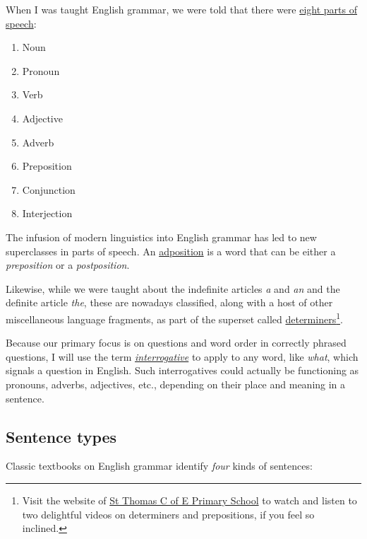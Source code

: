 \documentclass[
  11pt,
  british,
  a4paper,
]{article}
\providecommand{\tightlist}{%
  \setlength{\itemsep}{0pt}\setlength{\parskip}{0pt}}
\begin{document}
When I was taught English grammar, we were told that there were
\href{http://www.butte.edu/departments/cas/tipsheets/grammar/parts_of_speech.html}{eight
parts of speech}:

\begin{enumerate}
\tightlist
\item
  Noun
\item
  Pronoun
\item
  Verb
\item
  Adjective
\item
  Adverb
\item
  Preposition
\item
  Conjunction
\item
  Interjection
\end{enumerate}

The infusion of modern linguistics into English grammar has led to new
superclasses in parts of speech. An
\href{https://glossary.sil.org/term/adposition}{adposition} is a word
that can be either a \emph{preposition} or a \emph{postposition}.

Likewise, while we were taught about the indefinite articles \emph{a}
and \emph{an} and the definite article \emph{the}, these are nowadays
classified, along with a host of other miscellaneous language fragments,
as part of the superset called
\href{https://en.wikipedia.org/wiki/Determiner}{determiners}\footnote{Visit
  the website of
  \href{https://www.stthomaswernethprimary.co.uk/determiners-and-prepositions-1/}{St
  Thomas C of E Primary School} to watch and listen to two delightful
  videos on determiners and prepositions, if you feel so inclined.}.

Because our primary focus is on questions and word order in correctly
phrased questions, I will use the term
\href{https://en.wikipedia.org/wiki/Interrogative_word}{\emph{interrogative}}
to apply to any word, like \emph{what}, which signals a question in
English. Such interrogatives could actually be functioning as pronouns,
adverbs, adjectives, etc., depending on their place and meaning in a
sentence.

\hypertarget{sentence-types}{%
\subsection{Sentence types}\label{sentence-types}}

Classic textbooks on English grammar identify \emph{four} kinds of
sentences:
\end{document}
